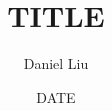 \documentclass[11pt]{article}
\renewcommand{\maketitle}{
    \begin{center}
        \textbf{\thetitle}\\
        \theauthor\\
        \thedate
    \end{center}
}
\begin{document}
\parindent=0pt

\title{TITLE}
\author{Daniel Liu}
\date{DATE}
\maketitle
\end{document}
